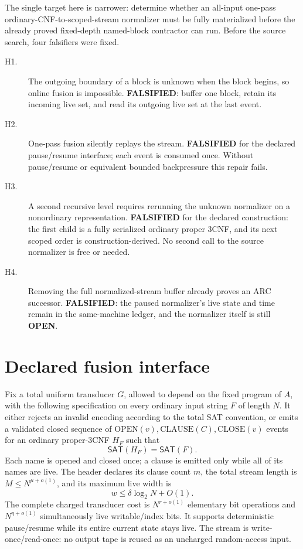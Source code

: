 \documentclass[11pt]{article}
\newcommand{\SAT}{\mathsf{SAT}}
\newcommand{\OPEN}{\textbf{OPEN}}
\begin{document}
The single target here is narrower: determine whether an all-input one-pass
ordinary-CNF-to-scoped-stream normalizer must be fully materialized before
the already proved fixed-depth named-block contractor can run.  Before the
source search, four falsifiers were fixed.
\begin{description}
\item[H1.] The outgoing boundary of a block is unknown when the block begins,
so online fusion is impossible.  \textbf{FALSIFIED}: buffer one block, retain
its incoming live set, and read its outgoing live set at the last event.
\item[H2.] One-pass fusion silently replays the stream.  \textbf{FALSIFIED}
for the declared pause/resume interface; each event is consumed once.
Without pause/resume or equivalent bounded backpressure this repair fails.
\item[H3.] A second recursive level requires rerunning the unknown normalizer
on a nonordinary representation.  \textbf{FALSIFIED} for the declared
construction: the first child is a fully serialized ordinary proper 3CNF,
and its next scoped order is construction-derived.  No second call to the
source normalizer is free or needed.
\item[H4.] Removing the full normalized-stream buffer already proves an ARC
successor.  \textbf{FALSIFIED}: the paused normalizer's live state and time
remain in the same-machine ledger, and the normalizer itself is still
\OPEN{}.
\end{description}

\section{Declared fusion interface}
Fix a total uniform transducer \(G\), allowed to depend on the fixed program
of \(A\), with the following specification on every ordinary input string
\(F\) of length \(N\).  It either rejects an invalid encoding according to
the total SAT convention, or emits a validated closed sequence of
\(\mathrm{OPEN}(v),\mathrm{CLAUSE}(C),\mathrm{CLOSE}(v)\) events for an
ordinary proper-3CNF \(H_F\) such that
\[
\SAT(H_F)=\SAT(F).
\]
Each name is opened and closed once; a clause is emitted only while all of
its names are live.  The header declares its clause count \(m\), the total
stream length is \(M\le N^{\mu+o(1)}\), and its maximum live width is
\[
w\le\delta\log_2 N+O(1).
\]
The complete charged transducer cost is \(N^{r+o(1)}\) elementary bit
operations and \(N^{\eta+o(1)}\) simultaneously live writable/index bits.
It supports deterministic pause/resume while its entire current state stays
live.  The stream is write-once/read-once: no output tape is reused as an
uncharged random-access input.
\end{document}
